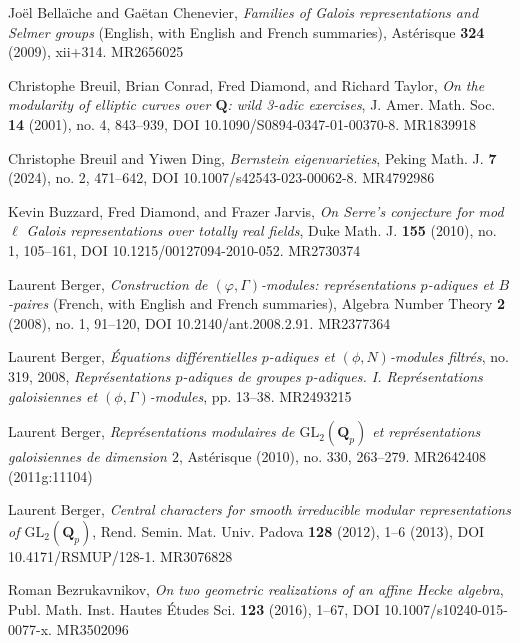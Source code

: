 \item[{[BC09]}] Jo\"el Bella\"{\i}che and Ga\"etan Chenevier, \emph{Families of Galois representations and Selmer groups} (English, with English and French summaries), Ast\'erisque \textbf{324} (2009), xii+314. MR2656025
\item[{[BCDT01]}] Christophe Breuil, Brian Conrad, Fred Diamond, and Richard Taylor, \emph{On the modularity of elliptic curves over $\mathbf{Q}$: wild 3-adic exercises}, J. Amer. Math. Soc. \textbf{14} (2001), no. 4, 843--939, DOI 10.1090/S0894-0347-01-00370-8. MR1839918
\item[{[BD24]}] Christophe Breuil and Yiwen Ding, \emph{Bernstein eigenvarieties}, Peking Math. J. \textbf{7} (2024), no. 2, 471--642, DOI 10.1007/s42543-023-00062-8. MR4792986
\item[{[BDJ10]}] Kevin Buzzard, Fred Diamond, and Frazer Jarvis, \emph{On Serre's conjecture for mod $\ell$ Galois representations over totally real fields}, Duke Math. J. \textbf{155} (2010), no. 1, 105--161, DOI 10.1215/00127094-2010-052. MR2730374
\item[{[Ber08a]}] Laurent Berger, \emph{Construction de $(\varphi,\Gamma)$-modules: repr\'esentations $p$-adiques et $B$-paires} (French, with English and French summaries), Algebra Number Theory \textbf{2} (2008), no. 1, 91--120, DOI 10.2140/ant.2008.2.91. MR2377364
\item[{[Ber08b]}] Laurent Berger, \emph{\'Equations diff\'erentielles $p$-adiques et $(\phi,N)$-modules filtr\'es}, no. 319, 2008, \emph{Repr\'esentations $p$-adiques de groupes $p$-adiques. I. Repr\'esentations galoisiennes et $(\phi,\Gamma)$-modules}, pp. 13--38. MR2493215
\item[{[Ber10]}] Laurent Berger, \emph{Repr\'esentations modulaires de $\mathrm{GL}_2(\mathbf{Q}_p)$ et repr\'esentations galoisiennes de dimension $2$}, Ast\'erisque (2010), no. 330, 263--279. MR2642408 (2011g:11104)
\item[{[Ber12]}] Laurent Berger, \emph{Central characters for smooth irreducible modular representations of $\mathrm{GL}_2(\mathbf{Q}_p)$}, Rend. Semin. Mat. Univ. Padova \textbf{128} (2012), 1--6 (2013), DOI 10.4171/RSMUP/128-1. MR3076828
\item[{[Bez16]}] Roman Bezrukavnikov, \emph{On two geometric realizations of an affine Hecke algebra}, Publ. Math. Inst. Hautes \'Etudes Sci. \textbf{123} (2016), 1--67, DOI 10.1007/s10240-015-0077-x. MR3502096
